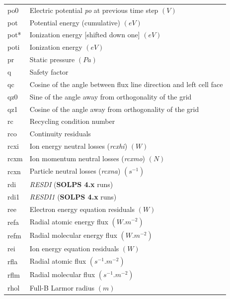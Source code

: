 \documentclass[a4paper,10pt]{report}
\newcommand\SOLPSfour{{\bf SOLPS 4.x} }
\begin{document}
\begin{center}
\begin{longtable}{|l|l|}
    po0      & \index{b2plot, po0} Electric potential {\em po} at previous time step $(V)$ \\
    pot      & \index{b2plot, pot} Potential energy (cumulative) $(eV)$ \\
    pot*     & \index{b2plot, pot*} Ionization energy [shifted down one] $(eV)$ \\
    poti     & \index{b2plot, poti} Ionization energy $(eV)$ \\
    pr       & \index{b2plot, pr} Static pressure $(Pa)$ \\
    q        & \index{b2plot, q} Safety factor \\
    qc       & \index{b2plot, qc} Cosine of the angle between flux line direction and left cell face \\
    qz0      & \index{b2plot, qz0} Sine of the angle away from orthogonality of the grid \\
    qz1      & \index{b2plot, qz1} Cosine of the angle away from orthogonality of the grid \\
    rc       & \index{b2plot, rc} Recycling condition number \\
    rco      & \index{b2plot, rco} Continuity residuals \\
    rcxi     & \index{b2plot, rcxi} Ion energy neutral losses ({\em rcxhi}) $(W)$ \\
    rcxm     & \index{b2plot, rcxm} Ion momentum neutral losses ({\em rcxmo}) $(N)$ \\
    rcxn     & \index{b2plot, rcxn} Particle neutral losses ({\em rcxna}) $(s^{-1})$ \\
    rdi      & \index{b2plot, rdi} {\em RESDI} (\SOLPSfour runs) \\
    rdi1     & \index{b2plot, rdi1} {\em RESDI1} (\SOLPSfour runs) \\
    ree      & \index{b2plot, ree} Electron energy equation residuals $(W)$ \\
    refa     & \index{b2plot, refa} Radial atomic energy flux $(W.m^{-2})$ \\
    refm     & \index{b2plot, refm} Radial molecular energy flux $(W.m^{-2})$ \\
    rei      & \index{b2plot, rei} Ion energy equation residuals $(W)$ \\
    rfla     & \index{b2plot, rfla} Radial atomic flux $(s^{-1}.m^{-2})$ \\
    rflm     & \index{b2plot, rflm} Radial molecular flux $(s^{-1}.m^{-2})$ \\
    rhol     & \index{b2plot, rhol} Full-B Larmor radius $(m)$ \\

\end{longtable}
\end{center}
\end{document}
